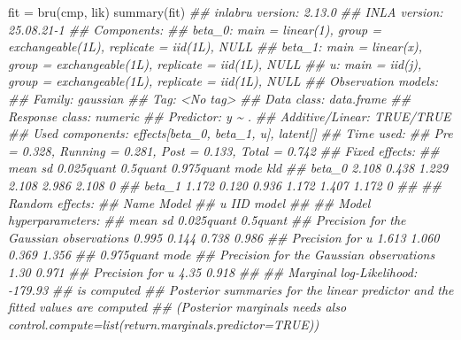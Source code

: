 \documentclass[
  letterpaper,
  DIV=11,
  numbers=noendperiod]{scrartcl}
\newenvironment{Shaded}{\begin{snugshade}}{\end{snugshade}}
\newcommand{\DocumentationTok}[1]{\textcolor[rgb]{0.37,0.37,0.37}{\textit{#1}}}
\newcommand{\FunctionTok}[1]{\textcolor[rgb]{0.28,0.35,0.67}{#1}}
\newcommand{\NormalTok}[1]{\textcolor[rgb]{0.00,0.23,0.31}{#1}}
\newcommand{\OtherTok}[1]{\textcolor[rgb]{0.00,0.23,0.31}{#1}}
\begin{document}
\begin{Shaded}
\begin{Highlighting}[]
\NormalTok{fit }\OtherTok{=} \FunctionTok{bru}\NormalTok{(cmp, lik)}
\FunctionTok{summary}\NormalTok{(fit)}
\DocumentationTok{\#\# inlabru version: 2.13.0}
\DocumentationTok{\#\# INLA version: 25.08.21{-}1}
\DocumentationTok{\#\# Components:}
\DocumentationTok{\#\# beta\_0: main = linear(1), group = exchangeable(1L), replicate = iid(1L), NULL}
\DocumentationTok{\#\# beta\_1: main = linear(x), group = exchangeable(1L), replicate = iid(1L), NULL}
\DocumentationTok{\#\# u: main = iid(j), group = exchangeable(1L), replicate = iid(1L), NULL}
\DocumentationTok{\#\# Observation models:}
\DocumentationTok{\#\#   Family: \textquotesingle{}gaussian\textquotesingle{}}
\DocumentationTok{\#\#     Tag: \textless{}No tag\textgreater{}}
\DocumentationTok{\#\#     Data class: \textquotesingle{}data.frame\textquotesingle{}}
\DocumentationTok{\#\#     Response class: \textquotesingle{}numeric\textquotesingle{}}
\DocumentationTok{\#\#     Predictor: y \textasciitilde{} .}
\DocumentationTok{\#\#     Additive/Linear: TRUE/TRUE}
\DocumentationTok{\#\#     Used components: effects[beta\_0, beta\_1, u], latent[]}
\DocumentationTok{\#\# Time used:}
\DocumentationTok{\#\#     Pre = 0.328, Running = 0.281, Post = 0.133, Total = 0.742 }
\DocumentationTok{\#\# Fixed effects:}
\DocumentationTok{\#\#         mean    sd 0.025quant 0.5quant 0.975quant  mode kld}
\DocumentationTok{\#\# beta\_0 2.108 0.438      1.229    2.108      2.986 2.108   0}
\DocumentationTok{\#\# beta\_1 1.172 0.120      0.936    1.172      1.407 1.172   0}
\DocumentationTok{\#\# }
\DocumentationTok{\#\# Random effects:}
\DocumentationTok{\#\#   Name     Model}
\DocumentationTok{\#\#     u IID model}
\DocumentationTok{\#\# }
\DocumentationTok{\#\# Model hyperparameters:}
\DocumentationTok{\#\#                                          mean    sd 0.025quant 0.5quant}
\DocumentationTok{\#\# Precision for the Gaussian observations 0.995 0.144      0.738    0.986}
\DocumentationTok{\#\# Precision for u                         1.613 1.060      0.369    1.356}
\DocumentationTok{\#\#                                         0.975quant  mode}
\DocumentationTok{\#\# Precision for the Gaussian observations       1.30 0.971}
\DocumentationTok{\#\# Precision for u                               4.35 0.918}
\DocumentationTok{\#\# }
\DocumentationTok{\#\# Marginal log{-}Likelihood:  {-}179.93 }
\DocumentationTok{\#\#  is computed }
\DocumentationTok{\#\# Posterior summaries for the linear predictor and the fitted values are computed}
\DocumentationTok{\#\# (Posterior marginals needs also \textquotesingle{}control.compute=list(return.marginals.predictor=TRUE)\textquotesingle{})}
\end{Highlighting}
\end{Shaded}
\end{document}

